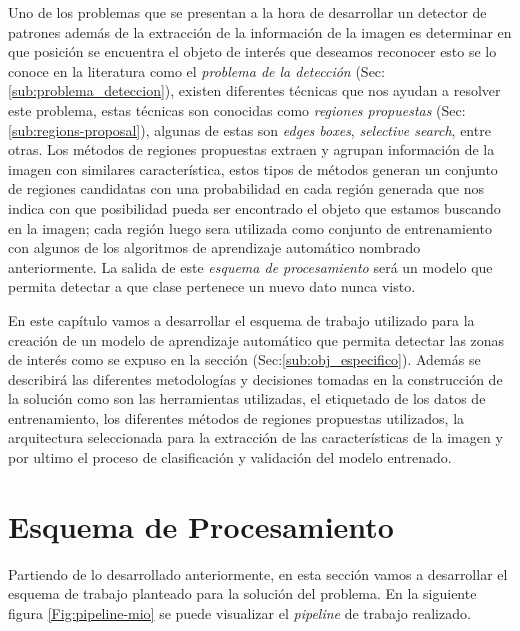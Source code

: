 Uno de los problemas que se presentan a la hora de desarrollar un detector de patrones además de la extracción de la información de la imagen es determinar en que posición se encuentra el objeto de interés que deseamos reconocer esto se lo conoce en la literatura como el \textit{problema de la detección} (Sec:\ref{sub:problema_deteccion}), existen diferentes técnicas que nos ayudan a resolver este problema, estas técnicas son conocidas como \textit{regiones propuestas} (Sec:\ref{sub:regions-proposal}), algunas de estas son \textit{edges boxes}, \textit{selective search}, entre otras. Los métodos de regiones propuestas extraen y agrupan información de la imagen con similares característica, estos tipos de métodos generan un conjunto de regiones candidatas con una probabilidad en cada región generada que nos indica con que posibilidad pueda ser encontrado el objeto que estamos buscando en la imagen; cada región luego sera utilizada como conjunto de entrenamiento con algunos de los algoritmos de aprendizaje automático nombrado anteriormente. La salida de este \textit{esquema de procesamiento} será un modelo que permita detectar a que clase pertenece un nuevo dato nunca visto.

En este capítulo vamos a desarrollar el esquema de trabajo utilizado para la creación de un modelo de aprendizaje automático que permita detectar las zonas de interés como se expuso en la sección (Sec:\ref{sub:obj_especifico}). Además se describirá las diferentes metodologías y decisiones tomadas en la construcción de la solución como son las herramientas utilizadas, el etiquetado de los datos de entrenamiento, los diferentes  métodos de regiones propuestas utilizados, la arquitectura seleccionada para la extracción de las características de la imagen y por ultimo el proceso de clasificación y validación del modelo entrenado.




%


\section{Esquema de Procesamiento}\label{sec: pipeline}

Partiendo de lo desarrollado anteriormente, en esta sección vamos a desarrollar el esquema de trabajo planteado para la solución del problema. En la siguiente figura \ref{Fig:pipeline-mio} se puede visualizar el \textit{pipeline} de trabajo realizado.

